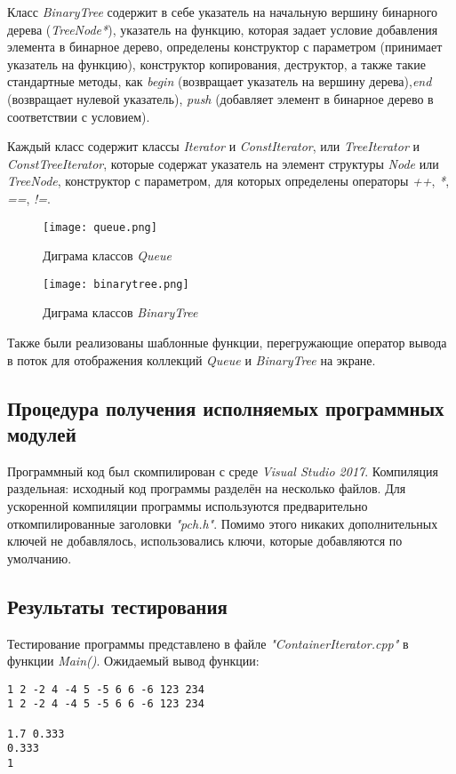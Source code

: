 \documentclass[a4paper,14pt]{article}
\begin{document}
Класс \textit{BinaryTree} содержит в себе указатель на начальную вершину бинарного дерева (\textit{TreeNode*}), указатель на функцию, которая задает условие добавления элемента в бинарное дерево, определены конструктор с параметром (принимает указатель на функцию), конструктор копирования, деструктор, а также такие стандартные методы, как \textit{begin} (возвращает указатель на вершину дерева),\textit{end} (возвращает нулевой указатель), \textit{push} (добавляет элемент в бинарное дерево в соответствии с условием).

Каждый класс содержит классы \textit{Iterator} и \textit{ConstIterator}, или \textit{TreeIterator} и\\ \textit{ConstTreeIterator}, которые содержат указатель на элемент структуры \textit{Node} или \textit{TreeNode}, конструктор с параметром, для которых определены операторы \textit{++}, \textit{*},\textit{ ==}, \textit{!=}.

\begin{figure}[H]
	\centering
	\texttt{[image: queue.png]}
	\caption{Диграма классов \textit{Queue}}	
\end{figure}

\begin{figure}[H]
	\centering
	\texttt{[image: binarytree.png]}
	\caption{Диграма классов \textit{BinaryTree}}	
\end{figure}

Также были реализованы шаблонные функции, перегружающие оператор вывода в поток для отображения коллекций \textit{Queue} и \textit{BinaryTree} на экране.

\subsection{Процедура получения исполняемых программных модулей}
Программный код был скомпилирован с среде \textit{Visual Studio 2017}. Компиляция раздельная: исходный код программы разделён на несколько файлов. Для ускоренной компиляции программы используются предварительно откомпилированные заголовки \textit{"pch.h"}. Помимо этого никаких дополнительных ключей не добавлялось, использовались ключи, которые добавляются по умолчанию. 
\subsection{Результаты тестирования}
Тестирование программы представлено в файле \textit{"ContainerIterator.cpp"} в функции \textit{Main()}. Ожидаемый вывод функции:
\begin{verbatim}
1 2 -2 4 -4 5 -5 6 6 -6 123 234
1 2 -2 4 -4 5 -5 6 6 -6 123 234

1.7 0.333
0.333
1
\end{verbatim}
\end{document}
